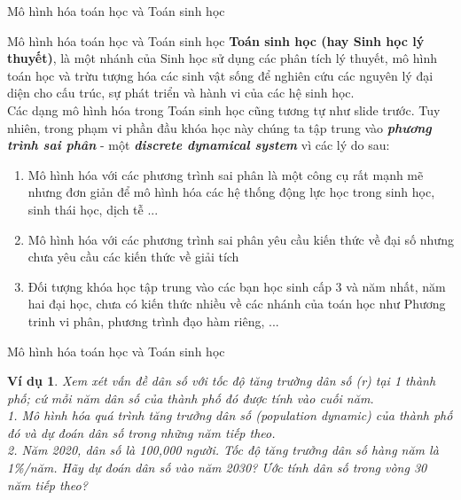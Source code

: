 \documentclass[pdf,aspectratio=169]{beamer}
\newtheorem*{vidu}{Ví dụ}
\begin{document}
\begin{frame}[plain]
    \begin{center}
        \vspace{1cm}
        \Huge Mô hình hóa toán học và Toán sinh học
    \end{center}
\end{frame}

\begin{frame}{Mô hình hóa toán học và Toán sinh học}
    \textbf{Toán sinh học (hay Sinh học lý thuyết)}, là một nhánh của Sinh học
    sử dụng các phân tích lý thuyết, mô hình toán học và trừu tượng hóa các sinh vật sống
    để nghiên cứu các nguyên lý đại diện cho cấu trúc, sự phát triển và hành vi của các hệ sinh học. \\
    Các dạng mô hình hóa trong Toán sinh học cũng tương tự như slide trước. Tuy nhiên, trong phạm vi
    phần đầu khóa học này chúng ta tập trung vào \textbf{\textit{phương trình sai phân}} - một \textbf{\textit{discrete dynamical system}} vì các lý do sau:
    \begin{enumerate}
        \item Mô hình hóa với các phương trình sai phân là một công cụ rất mạnh mẽ nhưng đơn giản để mô hình hóa các hệ thống động lực học trong sinh học, sinh thái học, dịch tễ ...
        \item Mô hình hóa với các phương trình sai phân yêu cầu kiến thức về đại số nhưng chưa yêu cầu các kiến thức về giải tích
        \item Đối tượng khóa học tập trung vào các bạn học sinh cấp 3 và năm nhất, năm hai đại học,
              chưa có kiến thức nhiều về các nhánh của toán học như Phương trinh vi phân, phương trình đạo hàm riêng, ...
    \end{enumerate}
\end{frame}

\begin{frame}{Mô hình hóa toán học và Toán sinh học}
    \begin{vidu}
        Xem xét vấn đề dân số với tốc độ tăng trường dân số (r) tại 1 thành phố; cứ mỗi năm dân số của thành phố đó được tính vào cuối năm.\\
        1. Mô hình hóa quá trình tăng trưởng dân số (population dynamic) của thành phố đó và dự đoán dân số trong những năm tiếp theo.\\
        2. Năm 2020, dân số là 100,000 người. Tốc độ tăng trưởng dân số hàng năm là 1\%/năm. Hãy dự đoán dân số vào năm 2030? Ước tính dân số trong vòng 30 năm tiếp theo?
    \end{vidu}
\end{frame}
\end{document}
